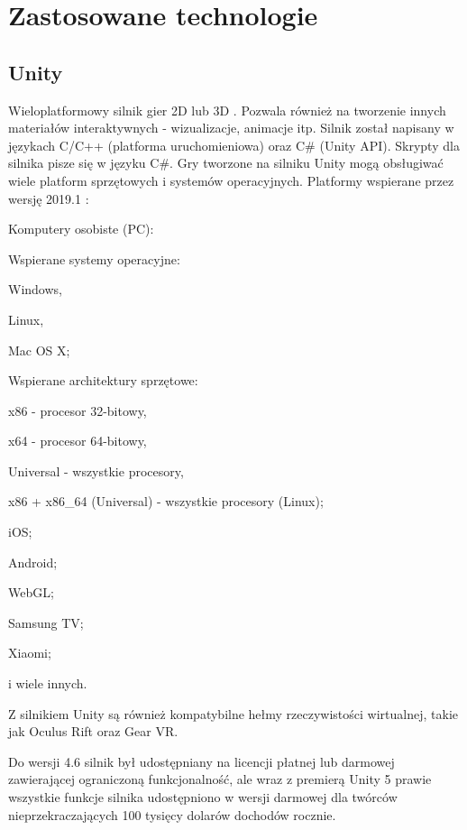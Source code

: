\chapter{Zastosowane technologie}
\section{Unity}
Wieloplatformowy silnik gier 2D lub 3D \cite{unity:opis}. Pozwala również na tworzenie innych materiałów interaktywnych - wizualizacje, animacje itp. Silnik został napisany w językach C/C++ (platforma uruchomieniowa) oraz C\# (Unity API). Skrypty dla silnika pisze się w języku C\#. Gry tworzone na silniku Unity mogą obsługiwać wiele platform sprzętowych i systemów operacyjnych. 
Platformy wspierane przez wersję 2019.1 \cite{unity:buildOptions}:
\begin{enumerate*}
\item Komputery osobiste (PC):
\begin{enumerate*}
\item Wspierane systemy operacyjne:
\begin{itemize*}
\item Windows,
\item Linux,
\item Mac OS X;
\end{itemize*}
\item Wspierane architektury sprzętowe:
\begin{itemize*}
\item x86 - procesor 32-bitowy,
\item x64 - procesor 64-bitowy,
\item Universal - wszystkie procesory,
\item x86 + x86\_64 (Universal) - wszystkie procesory (Linux);
\end{itemize*}
\end{enumerate*}
\item iOS;
\item Android;
\item WebGL;
\item Samsung TV;
\item Xiaomi;
\item i wiele innych.
\end{enumerate*}

Z silnikiem Unity są również kompatybilne hełmy rzeczywistości wirtualnej, takie jak Oculus Rift oraz Gear VR.

Do wersji 4.6 silnik był udostępniany na licencji płatnej lub darmowej zawierającej ograniczoną funkcjonalność, ale wraz z premierą Unity 5 prawie wszystkie funkcje silnika udostępniono w wersji darmowej dla twórców nieprzekraczających 100 tysięcy dolarów dochodów rocznie.

